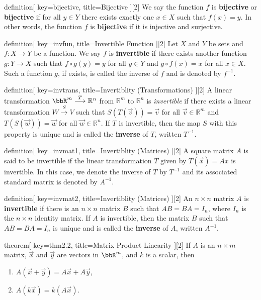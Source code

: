 \begin{SaveConcept}{definition}[
		key=bijective,
		title={Bijective}
	][2]
        We say the function $f$ is {\bf bijective} or {\bf bijective} if for all $y \in Y$ there exists exactly one $x \in X$ such that $f(x) = y$.	In other words, the function $f$ is {\bf bijective} if it is injective and surjective.
\end{SaveConcept}


\begin{SaveConcept}{definition}[
		key=invfun,
		title={Invertible Function}
	][2]
        Let $X$ and $Y$ be sets and $f:X \to Y$ be a function. We say $f$ is \textbf{invertible} if there exists another function $g:Y\to X$ such that $f\circ g (y)=y$ for all $y\in Y$ and $g\circ f(x)=x$ for all $x\in X.$ Such a function $g$, if exists, is called the inverse of $f$ and is denoted by $f^{-1}$.
\end{SaveConcept}


\begin{SaveConcept}{definition}[
		key=invtrans,
		title={Invertiblity (Transformations)}
	][2]
        A linear transformation $\bbR^m \overset{T}\longrightarrow \mathbb R^n$ from $\mathbb R^m$ to $\mathbb R^n$ is \emph{invertible} if there exists a linear transformation $W \overset{S}\longrightarrow V$ such that $S(T(\vec{v}))=\vec{v}$ for all $\vec{v}\in \mathbb R^m$ and $T(S(\vec{w}))=\vec{w}$ for all $\vec{w}\in \mathbb R^n$. If $T$ is invertible, then the map $S$ with this property is unique and is called the {\bf inverse} of $T$, written $T^{-1}$.
\end{SaveConcept}


\begin{SaveConcept}{definition}[
		key=invmat1,
		title={Invertiblity (Matrices)}
	][2]
        A square matrix $A$ is said to be invertible if the linear transformation $T$ given by $T (\vec x) = Ax$ is invertible. In this case, we denote the inverse of $T$ by $T^{-1}$ and its associated standard matrix is denoted by $A^{-1}$. 
\end{SaveConcept}


\begin{SaveConcept}{definition}[
		key=invmat2,
		title={Invertiblity (Matrices)}
	][2]
        An $n\times n$ matrix $A$ is {\bf invertible} if there is an $n\times n$ matrix $B$ such that $AB=BA=I_n$, where $I_n$ is the $n\times n$ identity matrix. If $A$ is invertible, then the matrix $B$ such that $AB=BA=I_n$ is unique and is called the {\bf inverse} of $A$, written $A^{-1}$.
\end{SaveConcept}
\begin{SaveConcept}{theorem}[
		key=thm2.2,
		title={Matrix Product Linearity}
	][2]
        If $A$ is an $n \times m$ matrix, $\vec x$ and $\vec y$ are vectors in $\bbR^m$, and $k$ is a scalar, then
        \begin{enumerate}
		\item $A(\vec x + \vec y) = A\vec x + A\vec y$,
		\item $A(k\vec x) = k(A\vec x)$.
	\end{enumerate}
\end{SaveConcept}

